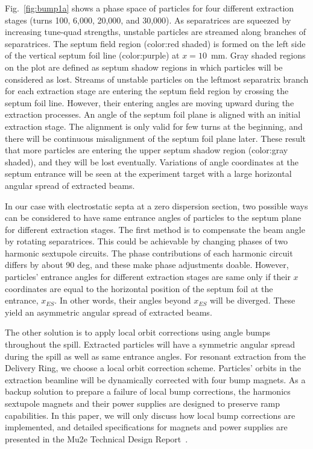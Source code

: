 \documentclass[aps,prstab,onecolumn,preprint]{revtex4-1}
\begin{document}
Fig.~\ref{fig:bump1a} shows a phase space of particles for four different extraction stages (turns 100, 6,000, 20,000, and 30,000). As separatrices are squeezed by increasing tune-quad strengths, unstable particles are streamed along branches of separatrices. The septum field region (color:red shaded) is formed on the left side of the vertical septum foil line (color:purple) at $x=10$~mm. Gray shaded regions on the plot are defined as septum shadow regions in which particles will be considered as lost. Streams of unstable particles on the leftmost separatrix branch for each extraction stage are entering the septum field region by crossing the septum foil line. However, their entering angles are moving upward during the extraction processes. An angle of the septum foil plane is aligned with an initial extraction stage. The alignment is only valid for few turns at the beginning, and there will be continuous misalignment of the septum foil plane later. These result that more particles are entering the upper septum shadow region (color:gray shaded), and they will be lost eventually.
Variations of angle coordinates at the septum entrance will be seen at the experiment target with a large horizontal angular spread of extracted beams.

In our case with electrostatic septa at a zero dispersion section, two possible ways can be considered to have same entrance angles of particles to the septum plane for different extraction stages. The first method is to compensate the beam angle by rotating separatrices. This could be achievable by changing phases of two harmonic sextupole circuits. The phase contributions of each harmonic circuit differs by about 90 deg, and these make phase adjustments doable. However, particles' entrance angles for different extraction stages are same only if their $x$ coordinates are equal to the horizontal position of the septum foil at the entrance, $x_{ES}$. In other words, their angles beyond $x_{ES}$ will be diverged. These yield an asymmetric angular spread of extracted beams.

The other solution is to apply local orbit corrections using angle bumps throughout the spill. Extracted particles will have a symmetric angular spread during the spill as well as same entrance angles. For resonant extraction from the Delivery Ring, we choose a local orbit correction scheme. Particles' orbits in the extraction beamline will be dynamically corrected with four bump magnets. As a backup solution to prepare a failure of local bump corrections, the harmonics sextupole magnets and their power supplies are designed to preserve ramp capabilities. In this paper, we will only discuss how local bump corrections are implemented, and detailed specifications for magnets and power supplies are presented in the Mu2e Technical Design Report~\cite{tdr}.
\end{document}
